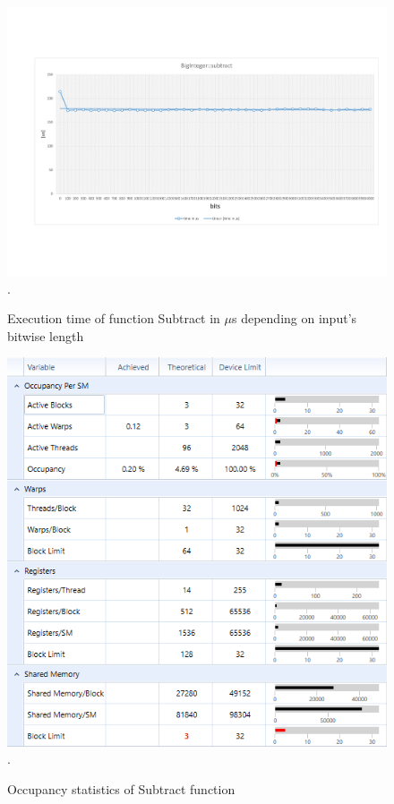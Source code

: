 \documentclass[oneside,openright,12pt,final,en]{mgr}
\begin{document}
\begin{figure}[H]
	\centering
	\includegraphics[width=\textwidth,trim={0.5cm 2.8cm 0.4cm 2.8cm},clip]{subtract.pdf}.
	\caption{Execution time of function Subtract in $\mu$s depending on input's bitwise length}
	\label{fig:subtract}
\end{figure}

\begin{figure}[H]
	\centering
	\includegraphics[width=\textwidth]{subtract_occupancy}.
	\caption{Occupancy statistics of Subtract function}
	\label{fig:subtract_occupancy}
\end{figure}
\end{document}
